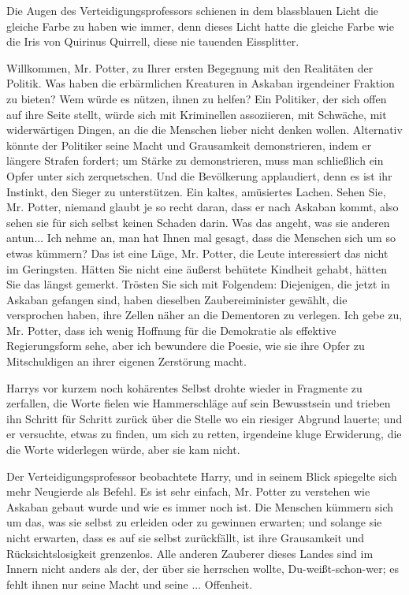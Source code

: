 Die Augen des Verteidigungsprofessors schienen in dem blassblauen Licht die
gleiche Farbe zu haben wie immer, denn dieses Licht hatte die gleiche Farbe wie
die Iris von Quirinus Quirrell, diese nie tauenden Eissplitter.

\glqq Willkommen, Mr. Potter, zu Ihrer ersten Begegnung mit den Realitäten der
Politik. Was haben die erbärmlichen Kreaturen in Askaban irgendeiner Fraktion zu
bieten? Wem würde es nützen, ihnen zu helfen? Ein Politiker, der sich offen auf
ihre Seite stellt, würde sich mit Kriminellen assoziieren, mit Schwäche, mit
widerwärtigen Dingen, an die die Menschen lieber nicht denken wollen. Alternativ
könnte der Politiker seine Macht und Grausamkeit demonstrieren, indem er längere
Strafen fordert; um Stärke zu demonstrieren, muss man schließlich ein Opfer
unter sich zerquetschen. Und die Bevölkerung applaudiert, denn es ist ihr
Instinkt, den Sieger zu unterstützen.\grqq{} Ein kaltes, amüsiertes Lachen.
\glqq Sehen Sie, Mr. Potter, niemand glaubt je so recht daran, dass er nach
Askaban kommt, also sehen sie für sich selbst keinen Schaden darin. Was das
angeht, was sie anderen antun... Ich nehme an, man hat Ihnen mal gesagt, dass
die Menschen sich um so etwas kümmern? Das ist eine Lüge, Mr. Potter, die Leute
interessiert das nicht im Geringsten. Hätten Sie nicht eine äußerst behütete
Kindheit gehabt, hätten Sie das längst gemerkt. Trösten Sie sich mit Folgendem:
Diejenigen, die jetzt in Askaban gefangen sind, haben dieselben Zaubereiminister
gewählt, die versprochen haben, ihre Zellen näher an die Dementoren zu verlegen.
Ich gebe zu, Mr. Potter, dass ich wenig Hoffnung für die Demokratie als
effektive Regierungsform sehe, aber ich bewundere die Poesie, wie sie ihre Opfer
zu Mitschuldigen an ihrer eigenen Zerstörung macht.\grqq{}

Harrys vor kurzem noch kohärentes Selbst drohte wieder in Fragmente zu
zerfallen, die Worte fielen wie Hammerschläge auf sein Bewusstsein und trieben
ihn Schritt für Schritt zurück über die Stelle wo ein riesiger Abgrund lauerte;
und er versuchte, etwas zu finden, um sich zu retten, irgendeine kluge
Erwiderung, die die Worte widerlegen würde, aber sie kam nicht.

Der Verteidigungsprofessor beobachtete Harry, und in seinem Blick spiegelte sich
mehr Neugierde als Befehl. \glqq Es ist sehr einfach, Mr. Potter zu verstehen
wie Askaban gebaut wurde und wie es immer noch ist. Die Menschen kümmern sich um
das, was sie selbst zu erleiden oder zu gewinnen erwarten; und solange sie nicht
erwarten, dass es auf sie selbst zurückfällt, ist ihre Grausamkeit und
Rücksichtslosigkeit grenzenlos. Alle anderen Zauberer dieses Landes sind im
Innern nicht anders als der, der über sie herrschen wollte, Du-weißt-schon-wer;
es fehlt ihnen nur seine Macht und seine ... Offenheit.\grqq{}

